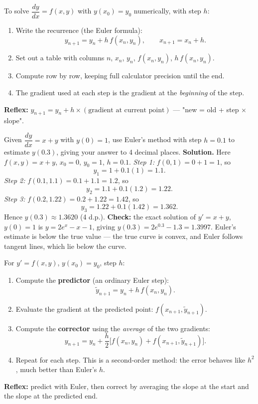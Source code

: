 \documentclass[11pt]{article}
\newcommand{\cle}[1]{{\popxbold\color{popdark}#1}}
\newcounter{popsec}
\newcounter{popsub}
\newcommand{\courssub}[1]{%
  \stepcounter{popsub}%
  \par\vspace{9pt}\noindent{\popxbold\fontsize{11.5}{13}\selectfont\color{popink}{\color{poporange}\thepopsec.\thepopsub}\hspace{6pt}#1}\par\nopagebreak\vspace{4pt}
}
\begin{document}
\begin{methode}[Euler's Method for $y'=f(x,y)$]
To solve $\dfrac{dy}{dx}=f(x,y)$ with $y(x_0)=y_0$ numerically, with step $h$:
\begin{enumerate}
\item Write the recurrence (the \cle{Euler formula}):
\[ y_{n+1}=y_n+h\,f(x_n,y_n),\qquad x_{n+1}=x_n+h. \]
\item Set out a table with columns $n$, $x_n$, $y_n$, $f(x_n,y_n)$, $h\,f(x_n,y_n)$.
\item Compute row by row, keeping full calculator precision until the end.
\item The gradient used at each step is the gradient at the \emph{beginning} of the step.
\end{enumerate}
\textbf{Reflex:} $y_{n+1}=y_n+h\times(\text{gradient at current point})$ — "new = old + step $\times$ slope".
\end{methode}

\begin{exoresolu}
Given $\dfrac{dy}{dx}=x+y$ with $y(0)=1$, use Euler's method with step $h=0.1$ to estimate $y(0.3)$, giving your answer to 4 decimal places.
\tcblower
\textbf{Solution.} Here $f(x,y)=x+y$, $x_0=0$, $y_0=1$, $h=0.1$.
\emph{Step 1:} $f(0,1)=0+1=1$, so
\[ y_1=1+0.1(1)=1.1. \]
\emph{Step 2:} $f(0.1,1.1)=0.1+1.1=1.2$, so
\[ y_2=1.1+0.1(1.2)=1.22. \]
\emph{Step 3:} $f(0.2,1.22)=0.2+1.22=1.42$, so
\[ y_3=1.22+0.1(1.42)=1.362. \]
Hence $y(0.3)\approx 1.3620$ (4 d.p.).
\textbf{Check:} the exact solution of $y'=x+y$, $y(0)=1$ is $y=2e^x-x-1$, giving $y(0.3)=2e^{0.3}-1.3=1.3997$. Euler's estimate is below the true value — the true curve is convex, and Euler follows tangent lines, which lie below the curve.
\end{exoresolu}

\courssub{The Improved Euler (Heun) Method}

\begin{methode}
For $y'=f(x,y)$, $y(x_0)=y_0$, step $h$:
\begin{enumerate}
\item Compute the \textbf{predictor} (an ordinary Euler step):
\[ \tilde{y}_{n+1}=y_n+h\,f(x_n,y_n). \]
\item Evaluate the gradient at the predicted point: $f(x_{n+1},\tilde{y}_{n+1})$.
\item Compute the \textbf{corrector} using the \emph{average} of the two gradients:
\[ y_{n+1}=y_n+\frac{h}{2}\Big[f(x_n,y_n)+f(x_{n+1},\tilde{y}_{n+1})\Big]. \]
\item Repeat for each step. This is a second-order method: the error behaves like $h^2$, much better than Euler's $h$.
\end{enumerate}
\textbf{Reflex:} predict with Euler, then correct by averaging the slope at the start and the slope at the predicted end.
\end{methode}
\end{document}
